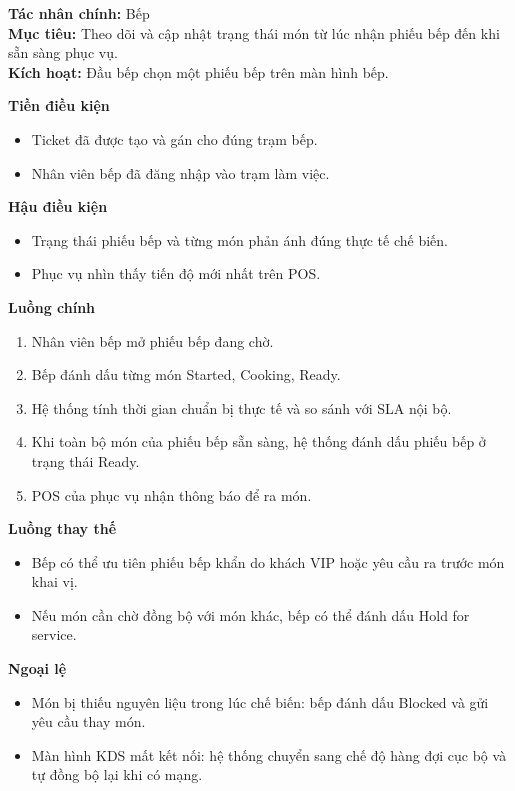 \documentclass[11pt,a4paper]{article}
\begin{document}
    \begin{usecasebox}[title={UC-KIT-01 --- Cập nhật tiến độ chế biến}]
    \textbf{Tác nhân chính:} Bếp\\
    \textbf{Mục tiêu:} Theo dõi và cập nhật trạng thái món từ lúc nhận phiếu bếp đến khi sẵn sàng phục vụ.\\
    \textbf{Kích hoạt:} Đầu bếp chọn một phiếu bếp trên màn hình bếp.

    \medskip
    \textbf{Tiền điều kiện}
    \begin{itemize}[leftmargin=1.8em]
  \item Ticket đã được tạo và gán cho đúng trạm bếp.
  \item Nhân viên bếp đã đăng nhập vào trạm làm việc.
\end{itemize}

    \textbf{Hậu điều kiện}
    \begin{itemize}[leftmargin=1.8em]
  \item Trạng thái phiếu bếp và từng món phản ánh đúng thực tế chế biến.
  \item Phục vụ nhìn thấy tiến độ mới nhất trên POS.
\end{itemize}

    \textbf{Luồng chính}
    \begin{enumerate}[leftmargin=1.8em]
  \item Nhân viên bếp mở phiếu bếp đang chờ.
  \item Bếp đánh dấu từng món \textsf{Started}, \textsf{Cooking}, \textsf{Ready}.
  \item Hệ thống tính thời gian chuẩn bị thực tế và so sánh với SLA nội bộ.
  \item Khi toàn bộ món của phiếu bếp sẵn sàng, hệ thống đánh dấu phiếu bếp ở trạng thái \textsf{Ready}.
  \item POS của phục vụ nhận thông báo để ra món.
\end{enumerate}

    \textbf{Luồng thay thế}
    \begin{itemize}[leftmargin=1.8em]
  \item Bếp có thể ưu tiên phiếu bếp khẩn do khách VIP hoặc yêu cầu ra trước món khai vị.
  \item Nếu món cần chờ đồng bộ với món khác, bếp có thể đánh dấu \textsf{Hold for service}.
\end{itemize}

    \textbf{Ngoại lệ}
    \begin{itemize}[leftmargin=1.8em]
  \item Món bị thiếu nguyên liệu trong lúc chế biến: bếp đánh dấu \textsf{Blocked} và gửi yêu cầu thay món.
  \item Màn hình KDS mất kết nối: hệ thống chuyển sang chế độ hàng đợi cục bộ và tự đồng bộ lại khi có mạng.
\end{itemize}


\end{usecasebox}
\end{document}
